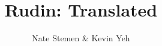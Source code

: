 \documentclass[nobib]{tufte-book}
\title{Rudin: Translated}
\author{Nate Stemen \& Kevin Yeh}
\begin{document}
\frontmatter
\maketitle
\tableofcontents
\listoftodos

\mainmatter


\printbibliography
\end{document}
